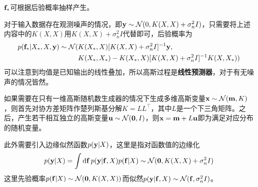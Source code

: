 \documentclass[12pt,UTF8]{article}
\begin{document}
            $\vb{f}_*$可根据后验概率抽样产生。\par
            对于输入数据存在观测噪声的情况，即$\vb{y}\sim\mathcal{N}(0,K(X,X)+\sigma_n^2I)$，只需要将上述内容中的$K(X,X)$用$K(X,X)+\sigma_n^2I$代替即可，后验概率为
            \begin{align}
                p(\vb{f}_*|X_*,X,\vb{y})\sim\mathcal{N}(&K(X_*,X)[K(X,X)+\sigma_n^2I]^{-1}\vb{y},\nonumber \\
                &K(X_*,X_*)-K(X_*,X)[K(X,X)+\sigma_n^2I]^{-1}K(X,X_*))
            \end{align}
            可以注意到均值是已知输出的线性叠加，所以高斯过程是\textbf{线性预测器}，对于有无噪声的情况皆然。\par
            如果需要在只有一维高斯随机数生成器的情况下生成多维高斯变量$\vb{x}\sim\mathcal{N}(\vb{m},K)$，则首先对协方差矩阵作楚列斯基分解$K=LL^\top$，其中$L$是一个下三角矩阵。之后，产生若干相互独立的高斯变量$\vb{u}\sim\mathcal{N}(\vb{0},I)$，则$\vb{x}=\vb{m}+L\vb{u}$即为满足对应分布的随机变量。\par
            此外需要引入边缘似然函数$p(\vb{y}|X)$，这里是指对函数值的边缘化
            \begin{equation}
                p(\vb{y}|X)=\int{\dd{\vb{f}}p(\vb{y}|\vb{f},X)p(\vb{f}|X)}\sim\mathcal{N}(\vb{0},K(X,X)+\sigma_n^2I)
            \end{equation}
            这里先验概率$p(\vb{f}|X)\sim\mathcal{N}(\vb{0},K(X,X))$而似然$p(\vb{y}|\vb{f},X)\sim\mathcal{N}(\vb{f},\sigma_n^2I)$。
\end{document}
